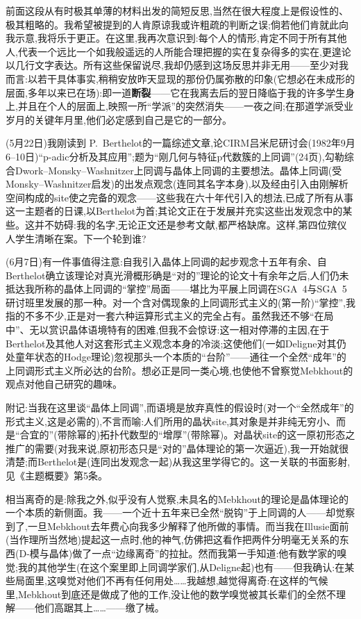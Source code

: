 前面这段从有时极其单薄的材料出发的简短反思,当然在很大程度上是假设性的、极其粗略的。我希望被提到的人肯原谅我或许粗疏的判断之误;倘若他们肯就此向我示意,我将乐于更正。在这里,我再次意识到:每个人的情形,肯定不同于所有其他人,代表一个远比一个如我般遥远的人所能合理把握的实在复杂得多的实在,更遑论以几行文字表达。所有这些保留说尽,我却仍感到这场反思并非无用——至少对我而言:以若干具体事实,稍稍安放昨天显现的那份仍属弥散的印象(它想必在未成形的层面,多年以来已在场):即一道\textbf{断裂}——它在我离去后的翌日降临于我的许多学生身上,并且在个人的层面上,映照一所“学派”的突然消失——一夜之间;在那道学派受业岁月的关键年月里,他们必定感到自己是它的一部分\dmark{}。


(5月22日)我刚读到 P.~Berthelot的一篇综述文章,论CIRM吕米尼研讨会(1982年9月6--10日)“p-adic分析及其应用”;题为“刚几何与特征p代数簇的上同调”(24页),勾勒综合Dwork--Monsky--Washnitzer上同调与晶体上同调的主要想法。晶体上同调(受Monsky--Washnitzer启发)的出发点观念(连同其名字本身),以及经由引入由刚解析空间构成的site使之完备的观念——这些我在六十年代引入的想法,已成了所有从事这一主题者的日课,以Berthelot为首;其论文正在于发展并充实这些出发观念中的某些。这并不妨碍:我的名字,无论正文还是参考文献,都严格缺席。这样,第四位殡仪人学生清晰在案。下一个轮到谁?

(6月7日)有一件事值得注意:自我引入晶体上同调的起步观念十五年有余、自Berthelot确立该理论对真光滑概形确是“对的”理论的论文十有余年之后,人们仍未抵达我所称的晶体上同调的“掌控”局面——堪比为平展上同调在SGA~4与SGA~5研讨班里发展的那一种。对一个含对偶现象的上同调形式主义的(第一阶)“掌控”,我指的不多不少,正是对一套六种运算形式主义的完全占有。虽然我还不够“在局中”、无以赏识晶体语境特有的困难,但我不会惊讶:这一相对停滞的主因,在于Berthelot及其他人对这套形式主义观念本身的冷淡;这使他们(一如Deligne对其仍处童年状态的Hodge理论)忽视那头一个本质的“台阶”——通往一个全然“成年”的上同调形式主义所必达的台阶\dmark{}。想必正是同一类心境,也使他不曾察觉Mebkhout的观点对他自己研究的趣味。

附记:当我在这里谈“晶体上同调”,而语境是放弃真性的假设时(对一个“全然成年”的形式主义,这是必需的),不言而喻:人们所用的晶状site,其对象是并非纯无穷小、而是“合宜的”(带除幂的)拓扑代数型的“增厚”(带除幂)。对晶状site的这一原初形态之推广的需要(对我来说,原初形态只是“对的”晶体理论的第一次逼近),我一开始就很清楚;而Berthelot是(连同出发观念一起)从我这里学得它的。这一关联的书面影射,见《主题概要》第5条。


相当离奇的是:除我之外,似乎没有人觉察,未具名的Mebkhout的理论是晶体理论的一个本质的新侧面。我——一个近十五年来已全然“脱钩”于上同调的人——却觉察到了,一旦Mebkhout去年费心向我多少解释了他所做的事情。而当我在Illusie面前(当作理所当然地)提起这一点时,他的神气,仿佛把这看作把两件分明毫无关系的东西(D-模与晶体)做了一点“边缘离奇”的拉扯。然而我第一手知道:他有数学家的嗅觉;我的其他学生(在这个案里即上同调学家们,从Deligne起)也有——但我确认:在某些局面里,这嗅觉对他们不再有任何用处……我越想,越觉得离奇:在这样的气候里,Mebkhout到底还是做成了他的工作,没让他的数学嗅觉被其长辈们的全然不理解——他们高踞其上……——缴了械。

